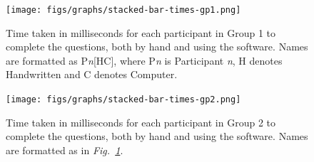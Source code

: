 \documentclass[12pt,twoside,notitlepage,xetex]{report}
\begin{document}
%
\begin{center}
\begin{figure}[H]
\begin{center}
\texttt{[image: figs/graphs/stacked-bar-times-gp1.png]}
\end{center}
\caption{Time taken in milliseconds for each participant in Group 1 to complete the questions, both by hand and using the software.  Names are formatted as P\emph{n}[HC], where P\emph{n} is Participant \emph{n}, H denotes Handwritten and C denotes Computer.}
\label{fig:StacksGp1}
\end{figure}
\end{center}

\begin{center}
\begin{figure}[H]
\begin{center}
\texttt{[image: figs/graphs/stacked-bar-times-gp2.png]}
\end{center}
\caption{Time taken in milliseconds for each participant in Group 2 to complete the questions, both by hand and using the software.  Names are formatted as in \emph{Fig.~\ref{fig:StacksGp1}}.}
\label{fig:StacksGp2}
\end{figure}
\end{center}
\end{document}
